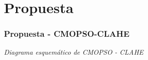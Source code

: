 \documentclass[usenames,dvipsnames]{beamer}
\begin{document}





\section{Propuesta}

\begin{frame}
\frametitle{Propuesta - CMOPSO-CLAHE} 
\begin{exampleblock}{\textit{Diagrama esquemático de CMOPSO - CLAHE}}

\centering
{}

\end{exampleblock}

\end{frame}

\end{document}
